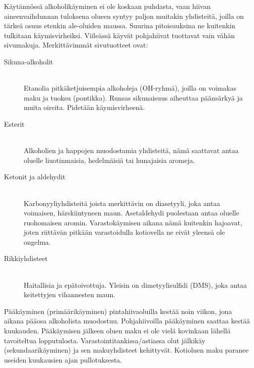 \documentclass[a4paper,11pt]{report}
\begin{document}
Käytännössä alkoholikäyminen ei ole koskaan puhdasta, vaan hiivan aineenvaihdunnan tuloksena olueen syntyy paljon muitakin yhdisteitä, joilla on tärkeä osuus etenkin ale-oluiden maussa. Suurina pitoisuuksina ne kuitenkin tulkitaan käymisvirheiksi. Viileässä käyvät pohjahiivat tuottavat vain vähän sivumakuja. Merkittävimmät sivutuotteet ovat:
\begin{description}
\item[Sikuna-alkoholit] \hfill \\
Etanolia pitkäketjuisempia alkoholeja (OH-ryhmä), joilla on voimakas maku ja tuoksu (pontikka). Runsas sikunaisuus aiheuttaa päänsärkyä ja muita oireita. Pidetään käymisvirheenä.
\item[Esterit] \hfill \\
Alkoholien ja happojen muodostamia yhdisteitä, nämä saattavat antaa oluelle liuotinmaisia, hedelmäisiä tai hunajaisia aromeja.
\item[Ketonit ja aldehydit] \hfill \\
Karbonyyliyhdisteitä joista merkittävin on diasetyyli, joka antaa voimaisen, härskiintyneen maun. Asetaldehydi puolestaan antaa oluelle ruohomaisen aromin. Varastokäymisen aikana nämä kuitenkin hajoavat, joten riittävän pitkään varastoidulla kotiovella ne eivät yleensä ole ongelma.
\item[Rikkiyhdisteet] \hfill \\
Haitallisia ja epätoivottuja. Yleisin on dimetyylisulfidi (DMS), joka antaa keitettyjen vihannesten maun.
\end{description}

Pääkäyminen (primäärikäyminen) pintahiivaoluilla kestää noin viikon, jona aikana pääosa alkoholista muodostuu. Pohjahiivoilla pääkäyminen saattaa kestää kuukauden. Pääkäymisen jälkeen oluen maku ei ole vielä kovinkaan lähellä tavoiteltua lopputulosta. Varastointitankissa/astiassa olut jälkikäy (sekundaarikäyminen) ja sen makuyhdisteet kehittyvät. Kotioluen maku paranee useiden kuukausien ajan pullotuksesta.
\end{document}
